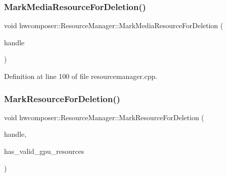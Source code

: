 \subsubsection{\texorpdfstring{Mark\+Media\+Resource\+For\+Deletion()}{MarkMediaResourceForDeletion()}}
{\footnotesize\ttfamily void hwcomposer\+::\+Resource\+Manager\+::\+Mark\+Media\+Resource\+For\+Deletion (\begin{DoxyParamCaption}\item[{const \mbox{\hyperlink{namespacehwcomposer_aa99e35835961ac7d6baa59a04131ff42}{Media\+Resource\+Handle}} \&}]{handle }\end{DoxyParamCaption})}



Definition at line 100 of file resourcemanager.\+cpp.


\begin{DoxyCode}{0}
\end{DoxyCode}
\mbox{\label{classhwcomposer_1_1ResourceManager_aed72efa73f3037049b1328ea35f162b3}} 
\subsubsection{\texorpdfstring{Mark\+Resource\+For\+Deletion()}{MarkResourceForDeletion()}}
{\footnotesize\ttfamily void hwcomposer\+::\+Resource\+Manager\+::\+Mark\+Resource\+For\+Deletion (\begin{DoxyParamCaption}\item[{const \mbox{\hyperlink{namespacehwcomposer_a963c5a1d5902d2d05710dba19af35b48}{Resource\+Handle}} \&}]{handle,  }\item[{bool}]{has\+\_\+valid\+\_\+gpu\+\_\+resources }\end{DoxyParamCaption})}



